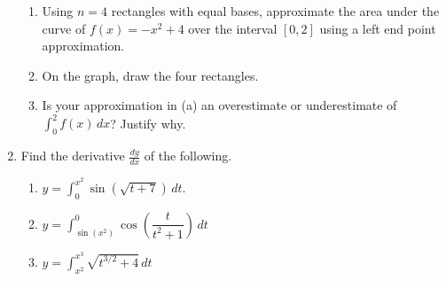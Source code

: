 \documentclass[12pt]{article}
\begin{document}
\begin{enumerate}
    \begin{enumerate}
        \item Using $n=4$ rectangles with equal bases, approximate the area under the curve of $f(x) = -x^2+4$ over the interval $[0,2]$ using a left end point approximation.
        \vspace{1.5in}
    
        \item On the graph, draw the four rectangles.
        \item Is your approximation in (a) an overestimate or underestimate of $\int_0^2 f(x)\,dx$? Justify why.
    \end{enumerate}

    \pagebreak

    
    \item Find the derivative $\frac{dy}{dx}$ of the following.
    \begin{enumerate}
        \item $y=\displaystyle\int_0^{x^2} \sin(\sqrt{t+7})\, dt.$
        \vfill
        \item $y=\displaystyle\int^0_{\sin(x^2)} \cos\left(\dfrac{t}{t^2+1}\right)\, dt$
        \vfill
        \item $y=\displaystyle\int_{x^2}^{x^3} \sqrt{t^{3/2}+4}\, dt$
        \vfill
    \end{enumerate}
\end{enumerate}
\end{document}
